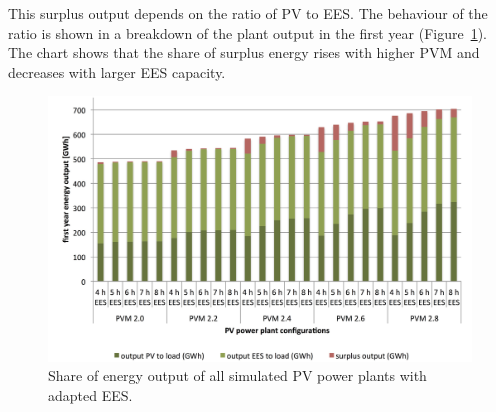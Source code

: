 
This surplus output depends on the ratio of PV to EES. The behaviour of the ratio is shown in a breakdown of the plant output in the first year (Figure~\ref{PV_energy_output}). The chart shows that the share of surplus energy rises with higher PVM and decreases with larger EES capacity.

\begin{figure}[htbp]  
\centering
\includegraphics[width=1\linewidth]{FIG/PV_energy_output}
\caption[Share of energy output of all simulated PV power plants with adapted EES.]{Share of energy output of all simulated PV power plants with adapted EES.}\label{PV_energy_output}
\end{figure}


